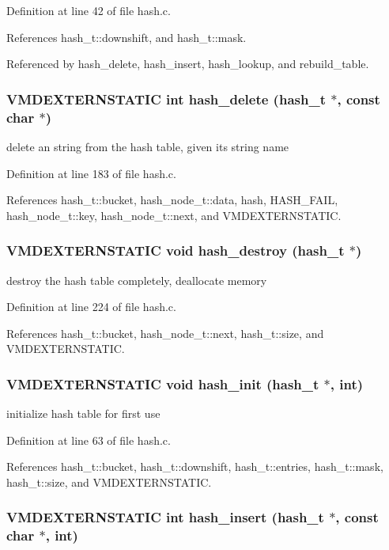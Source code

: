 Definition at line 42 of file hash.c.

References hash\_\-t::downshift, and hash\_\-t::mask.

Referenced by hash\_\-delete, hash\_\-insert, hash\_\-lookup, and rebuild\_\-table.
\subsubsection{\setlength{\rightskip}{0pt plus 5cm}VMDEXTERNSTATIC int hash\_\-delete ({\bf hash\_\-t} $\ast$, const char $\ast$)}\label{hash_8c_a7}


delete an string from the hash table, given its string name 

Definition at line 183 of file hash.c.

References hash\_\-t::bucket, hash\_\-node\_\-t::data, hash, HASH\_\-FAIL, hash\_\-node\_\-t::key, hash\_\-node\_\-t::next, and VMDEXTERNSTATIC.
\subsubsection{\setlength{\rightskip}{0pt plus 5cm}VMDEXTERNSTATIC void hash\_\-destroy ({\bf hash\_\-t} $\ast$)}\label{hash_8c_a8}


destroy the hash table completely, deallocate memory 

Definition at line 224 of file hash.c.

References hash\_\-t::bucket, hash\_\-node\_\-t::next, hash\_\-t::size, and VMDEXTERNSTATIC.
\subsubsection{\setlength{\rightskip}{0pt plus 5cm}VMDEXTERNSTATIC void hash\_\-init ({\bf hash\_\-t} $\ast$, int)}\label{hash_8c_a3}


initialize hash table for first use 

Definition at line 63 of file hash.c.

References hash\_\-t::bucket, hash\_\-t::downshift, hash\_\-t::entries, hash\_\-t::mask, hash\_\-t::size, and VMDEXTERNSTATIC.
\subsubsection{\setlength{\rightskip}{0pt plus 5cm}VMDEXTERNSTATIC int hash\_\-insert ({\bf hash\_\-t} $\ast$, const char $\ast$, int)}\label{hash_8c_a6}


